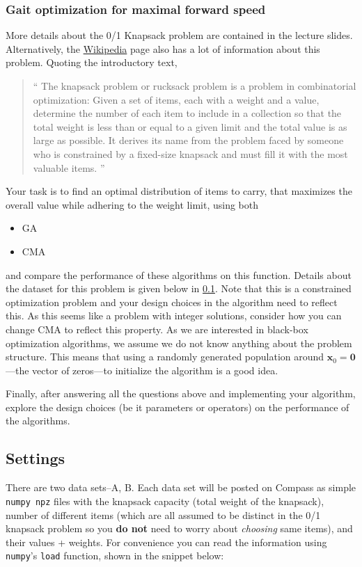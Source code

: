 \documentclass[11pt]{article}
\begin{document}
\subsubsection{Gait optimization for maximal forward speed}
\label{sec:orgebfa432}

More details about the 0/1 Knapsack problem are contained in the lecture slides.
Alternatively, the \href{https://en.wikipedia.org/wiki/Knapsack\_problem}{Wikipedia} page also has a lot of information about this
problem. Quoting the introductory text,
\begin{quote}
`` The knapsack problem or rucksack problem is a problem in combinatorial
optimization: Given a set of items, each with a weight and a value, determine
the number of each item to include in a collection so that the total weight is
less than or equal to a given limit and the total value is as large as possible.
It derives its name from the problem faced by someone who is constrained by a
fixed-size knapsack and must fill it with the most valuable items. ''
\end{quote}

Your task is to find an optimal distribution of items to carry, that
maximizes the overall value while adhering to the weight limit, using both
\begin{itemize}
\item GA
\item CMA
\end{itemize}
and compare the performance of these algorithms on this function. Details about
the dataset for this problem is given below in \cref{sec:data}. Note that this is a constrained
optimization problem and your design choices in the
algorithm need to reflect this. As this seems like a problem with integer
solutions, consider how you can change CMA to reflect this property. As we are
interested in black-box optimization algorithms, we assume we do not know
anything about the problem structure. This means that using a randomly generated
population around \(\mathbf{x}_0 =\mathbf{0}\)---the vector of zeros---to
initialize the algorithm is a good idea.

Finally, after answering all the questions above and implementing your
algorithm, explore the design choices (be it parameters or operators) on the
performance of the algorithms.
\subsection{Settings}
\label{sec:data}
There are two data sets--A, B. Each data set will be posted on Compass as
simple \texttt{numpy npz} files with the knapsack capacity (total weight of the
knapsack), number of different items (which are all assumed to be distinct in
the 0/1 knapsack problem so you \textbf{do not} need to worry about \emph{choosing} same
items), and their values + weights. For convenience you can read the
information using \texttt{numpy}'s \texttt{load} function, shown in the snippet below:
\end{document}
